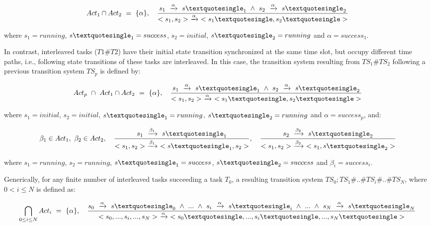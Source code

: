 $$Act_1 \cap Act_2\ =\ \{\alpha\},\quad \frac{s_1\ \xrightarrow{\alpha}\ s\textquotesingle_1\ \wedge\ s_2\ \xrightarrow{\alpha}\ s\textquotesingle_2}{<s_1,s_2>\ \xrightarrow{\alpha}\ <s_1\textquotesingle, s_2\textquotesingle>}$$

\noindent
where $s_1 = running$, $s\textquotesingle_1 = success$, $s_2 = initial$, $s\textquotesingle_2 = running$ and $\alpha = success_1$.
\medskip


In contrast, interleaved tasks ($T1\#T2$) have their initial state transition synchronized at the same time slot, but occupy different time paths, i.e., following state transitions of these tasks are interleaved. In this case, the transition system resulting from $TS_1\#TS_2$ following a previous transition system $TS_p$ is defined by:

$$Act_p\ \cap\ Act_1 \cap Act_2\ =\ \{\alpha\},\quad \frac{s_1\ \xrightarrow{\alpha}\ s\textquotesingle_1\ \wedge\ s_2\ \xrightarrow{\alpha}\ s\textquotesingle_2}{<s_1,s_2>\ \xrightarrow{\alpha}\ <s_1\textquotesingle, s_2\textquotesingle>}$$

\noindent
where $s_1 = initial$, $s_2 = initial$, $s\textquotesingle_1 = running$, $s\textquotesingle_2 = running$ and $\alpha = success_p$, and:

$$\beta_1 \in Act_1,\ \beta_2 \in Act_2,\quad \frac{s_1\ \xrightarrow{\beta_1}\ s\textquotesingle_1}{<s_1,s_2>\ \xrightarrow{\beta_1}\ <s\textquotesingle_1, s_2>},\quad \frac{s_2\ \xrightarrow{\beta_2}\ s\textquotesingle_2}{<s_1,s_2>\ \xrightarrow{\beta_2}\ <s_1, s\textquotesingle_2>}$$

\noindent
where $s_1 = running$, $s_2 = running$, $ s\textquotesingle_1 = success$, $s\textquotesingle_2 = success$ and $\beta_i = success_i$.
\bigskip

Generically, for any finite number of interleaved tasks succeeding a task $T_0$, a resulting transition system $TS_0;TS_1\#..\#TS_i\#..\#TS_N$, where $0 < i \leq N$ is defined as:

$$\bigcap_{0 \leq i \leq N} Act_i\ =\ \{\alpha\},\quad \frac{s_0\ \xrightarrow{\alpha}\ s\textquotesingle_0\ \wedge\ ...\ \wedge\ s_i\ \xrightarrow{\alpha}\ s\textquotesingle_i\ \wedge\ ...\ \wedge\ s_N\ \xrightarrow{\alpha}\ s\textquotesingle_N}{<s_0,...,s_i,...,s_N>\ \xrightarrow{\alpha}\ <s_0\textquotesingle, ...,s_i\textquotesingle,...,s_N\textquotesingle>}$$
\medskip

